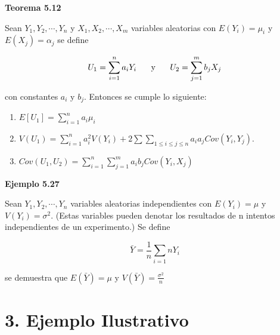 \documentclass[
]{article}
\begin{document}
\begin{cajainferencia}

  \textbf{Teorema 5.12}
    
    Sean $Y_{1},Y_{2},\cdots, Y_{n}$ y $X_{1},X_{2},\cdots, X_{m}$ variables aleatorias con $E(Y_{i})=\mu_{i}$ y $E(X_{j})=\alpha_{j}$
se define

$$U_{1} = \sum_{i=1}^{n}a_{i}Y_{i} \hspace{0.5cm} \text{ y } \hspace{0.5cm} U_{2} = \sum_{j=1}^{m}b_{j}X_{j} $$

con constantes $a_{i} \text{ y } b_{j}$. Entonces se cumple lo siguiente:

\vspace{0.2cm}

\begin{enumerate}
    
    \item $E[U_{1}] = \sum_{i=1}^{n}a_{i}\mu_{i}$
    
    \item $ \displaystyle V(U_{1}) = \sum_{i=1}^{n}a_{i}^{2}V(Y_{i}) + 2\sum \sum_{1\leq i \leq j \leq n} a_{i}a_{j} Cov(Y_{i},Y_{j}) $.
    
    \item $\displaystyle Cov(U_{1},U_{2}) = \sum_{i=1}^{n} \sum_{j=1}^{m} a_{i}b_{j} Cov(Y_{i},X_{j}) $
  
\end{enumerate}
  

\end{cajainferencia}

\begin{cajainferencia}

\textbf{Ejemplo 5.27}

Sean $Y_{1},Y_{2}, \cdots ,Y_{n}$ variables aleatorias independientes con $E(Y_{i}) = \mu$ y $V(Y_{i}) = \sigma^{2}$. (Estas
variables pueden denotar los resultados de n intentos independientes de un experimento.) Se define

$$\bar{Y}= \frac{1}{n}\sum_{i=1}{n}Y_{i}$$

se demuestra que $\displaystyle E(\bar{Y})=\mu \text{ y } V(\bar{Y}) = \frac{\sigma^2}{n}$

\end{cajainferencia}


\hypertarget{ejemplo-ilustrativo}{%
\section{3. Ejemplo Ilustrativo}\label{ejemplo-ilustrativo}}
\end{document}
